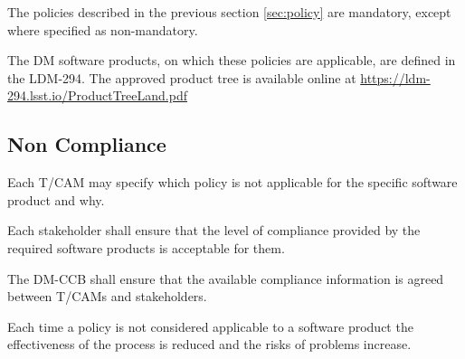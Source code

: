 The policies described in the previous section \ref{sec:policy} are mandatory, except where specified as non-mandatory.

The \gls{DM} software products, on which these policies are applicable, are defined in the LDM-294.
The approved product tree is available online at \url{https://ldm-294.lsst.io/ProductTreeLand.pdf}



\subsection{Non Compliance} \label{sec:noncompliance}

Each T/CAM may  specify which policy is not applicable for the specific software product and why.

Each stakeholder shall ensure that the level of compliance provided by the required software products is acceptable for them.

The DM-CCB shall ensure that the available compliance information is agreed between T/CAMs and stakeholders.

Each time a policy is not considered applicable to a software product the effectiveness of the process is reduced and the risks of problems increase.
